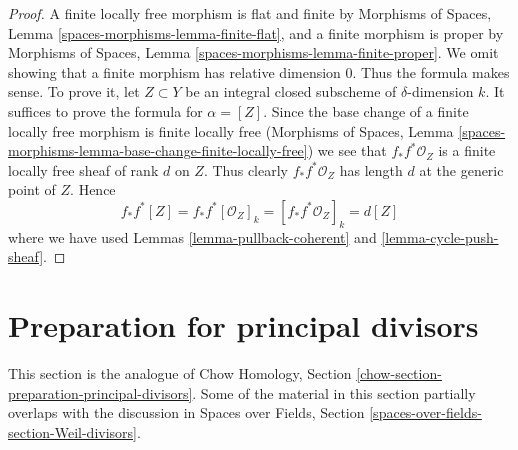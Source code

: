\begin{proof}
A finite locally free morphism is flat and finite by
Morphisms of Spaces, Lemma \ref{spaces-morphisms-lemma-finite-flat},
and a finite morphism is proper
by Morphisms of Spaces, Lemma \ref{spaces-morphisms-lemma-finite-proper}.
We omit showing that a finite
morphism has relative dimension $0$. Thus the formula makes sense.
To prove it, let $Z \subset Y$ be an integral closed subscheme
of $\delta$-dimension $k$. It suffices to prove the formula
for $\alpha = [Z]$. Since the base change of a finite locally free
morphism is finite locally free
(Morphisms of Spaces, Lemma
\ref{spaces-morphisms-lemma-base-change-finite-locally-free})
we see that $f_*f^*\mathcal{O}_Z$ is a finite locally free sheaf of
rank $d$ on $Z$. Thus clearly $f_*f^*\mathcal{O}_Z$ has length $d$
at the generic point of $Z$. Hence
$$
f_*f^*[Z] = f_*f^*[\mathcal{O}_Z]_k =
[f_*f^*\mathcal{O}_Z]_k = d[Z]
$$
where we have used Lemmas \ref{lemma-pullback-coherent} and
\ref{lemma-cycle-push-sheaf}.
\end{proof}










\section{Preparation for principal divisors}
\label{section-preparation-principal-divisors}

\noindent
This section is the analogue of
Chow Homology, Section \ref{chow-section-preparation-principal-divisors}.
Some of the material in this section partially overlaps with the
discussion in Spaces over Fields, Section
\ref{spaces-over-fields-section-Weil-divisors}.



















